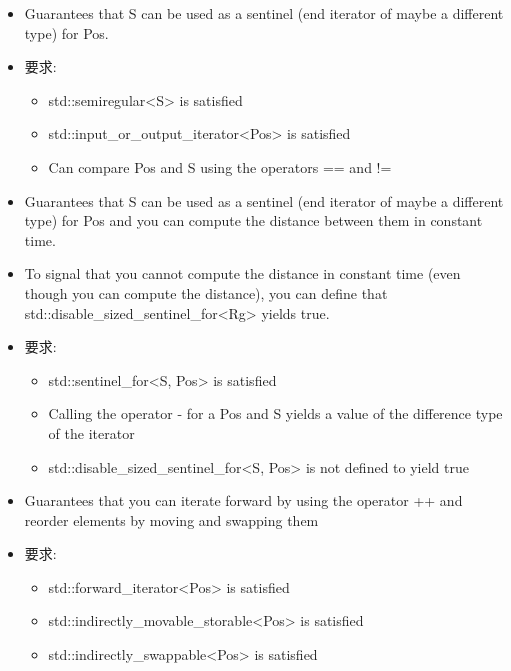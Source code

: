 
\begin{itemize}
\item
Guarantees that S can be used as a sentinel (end iterator of maybe a different type) for Pos.

\item
要求:
\begin{itemize}
\item
std::semiregular<S> is satisfied

\item
std::input\_or\_output\_iterator<Pos> is satisfied

\item
Can compare Pos and S using the operators == and !=
\end{itemize}
\end{itemize}


\begin{itemize}
\item
Guarantees that S can be used as a sentinel (end iterator of maybe a different type) for Pos and you can compute the distance between them in constant time.

\item
To signal that you cannot compute the distance in constant time (even though you can compute the distance), you can define that std::disable\_sized\_sentinel\_for<Rg> yields true.

\item
要求:
\begin{itemize}
\item
std::sentinel\_for<S, Pos> is satisfied

\item
Calling the operator - for a Pos and S yields a value of the difference type of the iterator

\item
std::disable\_sized\_sentinel\_for<S, Pos> is not defined to yield true
\end{itemize}
\end{itemize}



\begin{itemize}
\item
Guarantees that you can iterate forward by using the operator ++ and reorder elements by moving and swapping them

\item
要求:
\begin{itemize}
\item
std::forward\_iterator<Pos> is satisfied

\item
std::indirectly\_movable\_storable<Pos> is satisfied

\item
std::indirectly\_swappable<Pos> is satisfied
\end{itemize}
\end{itemize}


